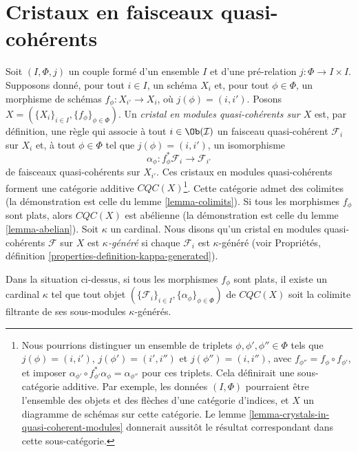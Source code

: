 \section{Cristaux en faisceaux quasi-cohérents}
\label{section-crystals}

\noindent
Soit $(I, \Phi, j)$ un couple formé d'un ensemble $I$ et d'une pré-relation $j : \Phi \to I \times I$. Supposons donné, pour tout $i \in I$, un schéma $X_i$ et, pour tout $\phi \in \Phi$, un morphisme de schémas $f_\phi : X_{i'} \to X_i$, où $j(\phi) = (i, i')$. Posons $X = (\{X_i\}_{i \in I}, \{f_\phi\}_{\phi \in \Phi})$. Un {\it cristal en modules quasi-cohérents sur $X$} est, par définition, une règle qui associe à tout $i \in \Ob(\mathcal{I})$ un faisceau quasi-cohérent $\mathcal{F}_i$ sur $X_i$ et, à tout $\phi \in \Phi$ tel que $j(\phi) = (i, i')$, un isomorphisme
$$
\alpha_\phi : f_\phi^*\mathcal{F}_i \longrightarrow \mathcal{F}_{i'}
$$
de faisceaux quasi-cohérents sur $X_{i'}$. Ces cristaux en modules quasi-cohérents forment une catégorie additive $\textit{CQC}(X)$\footnote{Nous pourrions distinguer un ensemble de triplets $\phi, \phi', \phi'' \in \Phi$ tels que $j(\phi) = (i, i')$, $j(\phi') = (i', i'')$ et $j(\phi'') = (i, i'')$, avec $f_{\phi''} = f_\phi \circ f_{\phi'}$, et imposer $\alpha_{\phi'} \circ f_{\phi'}^*\alpha_\phi = \alpha_{\phi''}$ pour ces triplets. Cela définirait une sous-catégorie additive. Par exemple, les données $(I, \Phi)$ pourraient être l'ensemble des objets et des flèches d'une catégorie d'indices, et $X$ un diagramme de schémas sur cette catégorie. Le lemme \ref{lemma-crystals-in-quasi-coherent-modules} donnerait aussitôt le résultat correspondant dans cette sous-catégorie.}. Cette catégorie admet des colimites (la démonstration est celle du lemme \ref{lemma-colimits}). Si tous les morphismes $f_\phi$ sont plats, alors $\textit{CQC}(X)$ est abélienne (la démonstration est celle du lemme \ref{lemma-abelian}). Soit $\kappa$ un cardinal. Nous disons qu'un cristal en modules quasi-cohérents $\mathcal{F}$ sur $X$ est {\it $\kappa$-généré} si chaque $\mathcal{F}_i$ est $\kappa$-généré (voir Propriétés, définition \ref{properties-definition-kappa-generated}).

\begin{lemma}
\label{lemma-crystals-in-quasi-coherent-modules}
Dans la situation ci-dessus, si tous les morphismes $f_\phi$ sont plats, il existe un cardinal $\kappa$ tel que tout objet $(\{\mathcal{F}_i\}_{i \in I}, \{\alpha_\phi\}_{\phi \in \Phi})$ de $\textit{CQC}(X)$ soit la colimite filtrante de ses sous-modules $\kappa$-générés.
\end{lemma}

